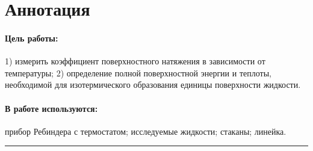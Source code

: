 \documentclass[a4paper,12pt]{report}
\begin{document}
	
	\newpage
    \pagestyle{fancy}

    \fancyhead{}
    \fancyfoot{}
    \fancyhead[L]{\rightmark}
    \fancyhead[R]{\thepage}

    \section*{Аннотация}
        \paragraph*{Цель работы:} 1) измерить коэффициент поверхностного натяжения в зависимости от температуры; 2) определение полной поверхностной энергии и теплоты, необходимой для изотермического образования единицы поверхности жидкости.
        \paragraph*{В работе используются:} прибор Ребиндера с термостатом; исследуемые жидкости; стаканы; линейка.
    \vspace{0.5cm}
    \hrule
\end{document}
